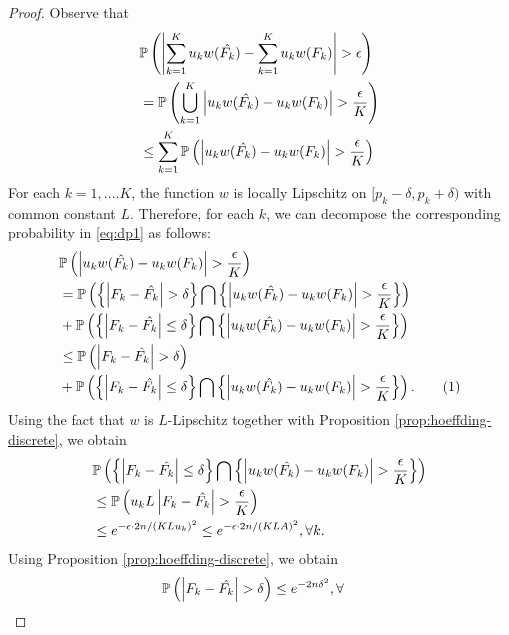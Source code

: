 \begin{proof}
Observe that
\begin{align}
&\mathbb{P}\left( \left| \sum_{k=1}^K u_k w(\hat{F_k}) - \sum_{k=1}^K u_k w(F_k) \right| >\epsilon \right)\nonumber\\
 & = \mathbb{P}\left( 
\bigcup_{k=1}^K \left| u_k w(\hat{F_k}) -u_k w(F_k) \right| > \frac {\epsilon} {K} \right) \nonumber\\ & \leq
    \sum_{k=1}^K \mathbb{P}\left( \left| u_k w(\hat{F_k}) -u_k w(F_k) \right| > \frac {\epsilon} {K} \right)\label{eq:dp1}
\end{align}
For each $k =1,....K$,
the function $w$ is locally Lipschitz on $[{p_k}- \delta, {p_k}+\delta)$ with common constant $L$.
Therefore, for each $k$, we can decompose the corresponding probability in \eqref{eq:dp1} as follows: 
\begin{align*}
& \Prob{\left| u_k w(\hat{F_k}) -u_k w(F_k) \right| > \frac {\epsilon} {K}} \\ 
& = \Prob{ \left\{ \left| F_k -
\hat{F_k} \right| >\delta \right\} \bigcap \left\{ \left| u_k w(\hat{F_k}) -u_k w(F_k) \right|  > \frac
{\epsilon} {K}\right\}}\\
& + \Prob{ \left\{ \left| F_k - \hat{F_k} \right| \leq\delta \right\} \bigcap \left\{ \left| u_k
    w(\hat{F_k}) -u_k w(F_k) \right|  > \frac {\epsilon} {K}\right\}} 
		\\ & \leq \Prob{ \left| F_k - \hat{F_k}
    \right| >\delta} \\
		&+ \Prob{ \left\{ \left| F_k - \hat{F_k} \right| \leq\delta \right\} \bigcap \left\{ \left| u_k
    w(\hat{F_k}) -u_k w(F_k) \right|  > \frac {\epsilon} {K}\right\}}.\stepcounter{equation}\tag{\theequation}\label{eq:hd0}
\end{align*}
Using the fact that $w$ is $L$-Lipschitz together with Proposition \ref{prop:hoeffding-discrete},
we obtain
\begin{align}
& \mathbb{P}\left(  \left\{ \left| F_k - \hat{F_k} \right| \leq\delta \right\} \bigcap \left\{ \left| u_k
    w(\hat{F_k}) -u_k w(F_k) \right|  > \frac {\epsilon} {K}\right\} \right) \nonumber\\ 
		& \leq \mathbb{P}\left( u_k L \left| F_k - \hat{F_k} \right| > \frac
    {\epsilon} {K} \right)\nonumber\\
		&\leq e^ {-\epsilon\cdot 2n /(K L u_k)^2} \leq e^ {-\epsilon\cdot 2n /(K L A)^2},
     \forall k.\label{eq:hd1}
\end{align}
Using Proposition \ref{prop:hoeffding-discrete}, we obtain
\begin{align}
\Prob{\left| F_k - \hat{F_k} \right| > \delta} & \leq e^{-2n\delta^2},   \forall

\end{align}
\end{proof}
